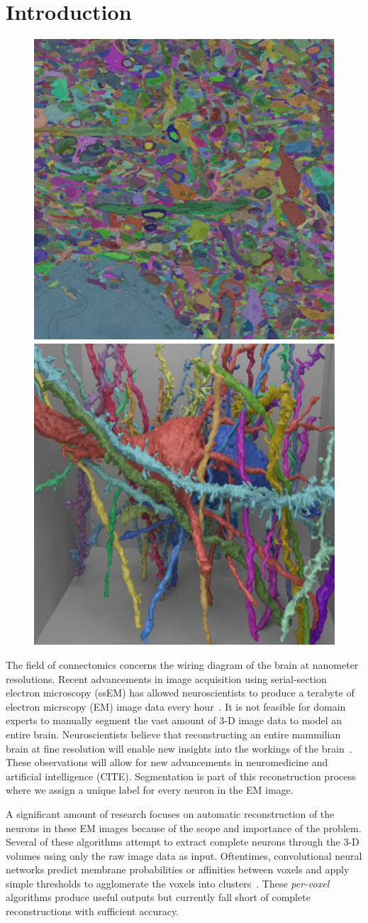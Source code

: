 \section{Introduction}

\begin{figure}
	\centering
	\includegraphics[width=0.42\linewidth]{./figures/intro-slice.png}
	\hspace{0.085\linewidth}
	\includegraphics[width=0.42\linewidth]{./figures/intro-cube.png}
\end{figure}

The field of connectomics concerns the wiring diagram of the brain at nanometer resolutions. 
Recent advancements in image acquisition using serial-section electron microscopy (ssEM) has allowed neuroscientists to produce a terabyte of electron micrscopy (EM) image data every hour~\cite{hildebrand2017whole}.
It is not feasible for domain experts to manually segment the vast amount of 3-D image data to model an entire brain.
Neuroscientists believe that reconstructing an entire mammilian brain at fine resolution will enable new insights into the workings of the brain~\cite{kasthuri2015saturated}. 
These observations will allow for new advancements in neuromedicine and artificial intelligence (CITE). 
Segmentation is part of this reconstruction process where we assign a unique label for every neuron in the EM image.

A significant amount of research focuses on automatic reconstruction of the neurons in these EM images because of the scope and importance of the problem. 
Several of these algorithms attempt to extract complete neurons through the 3-D volumes using only the raw image data as input.
Oftentimes, convolutional neural networks predict membrane probabilities or affinities between voxels and apply simple thresholds to agglomerate the voxels into clusters~\cite{lee2015recursive,ronneberger2015u}.
These \textit{per-voxel} algorithms produce useful outputs but currently fall short of complete reconstructions with sufficient accuracy. 

